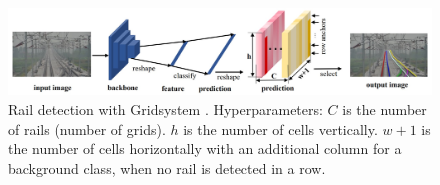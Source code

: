 \begin{figure}[H]
    \centering
    \includegraphics[width=\linewidth]{PICs/lineDetection/gridDetection.jpg}
    \caption{Rail detection with Gridsystem \cite{li2022rail}. Hyperparameters: $C$ is the number of rails (number of grids). $h$ is the number of cells vertically. $w+1$ is the number of cells horizontally with an additional column for a background class, when no rail is detected in a row.}
    \label{fig:gridLineDetection}
\end{figure}

